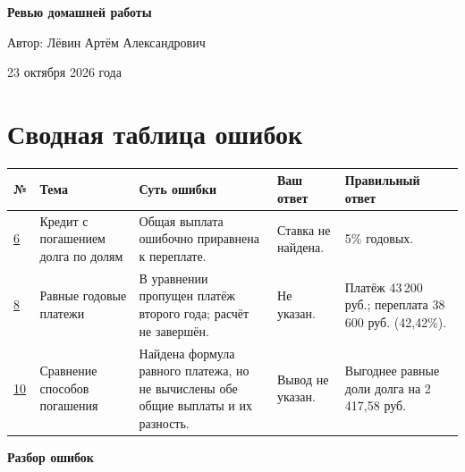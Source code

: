 \documentclass[12pt,a4paper]{article}
\begin{document}
\thispagestyle{empty}
\vspace*{0.28\textheight}
\begin{center}
{\Huge\bfseries Ревью домашней работы\par}
\vspace{20mm}
{\large Автор: Лёвин Артём Александрович\par}
\vspace{5mm}
{\large 23 октября 2026 года\par}
\end{center}
\vfill
\begin{center}
\end{center}
\newpage

\section*{Сводная таблица ошибок}
{\small
\setlength{\tabcolsep}{4pt}
\begin{longtable}{@{}p{0.9cm}p{2.5cm}p{4.65cm}p{3.0cm}p{3.5cm}@{}}
\toprule
\textbf{№} & \textbf{Тема} & \textbf{Суть ошибки} & \textbf{Ваш ответ} & \textbf{Правильный ответ} \\
\midrule
\endhead
\hyperref[task:6]{6} & Кредит с погашением долга по долям & Общая выплата ошибочно приравнена к переплате. & Ставка не найдена. & 5\% годовых. \\
\midrule
\hyperref[task:8]{8} & Равные годовые платежи & В уравнении пропущен платёж второго года; расчёт не завершён. & Не указан. & Платёж 43\,200 руб.; переплата 38\,600 руб. (42,42\%). \\
\midrule
\hyperref[task:10]{10} & Сравнение способов погашения & Найдена формула равного платежа, но не вычислены обе общие выплаты и их разность. & Вывод не указан. & Выгоднее равные доли долга на 2\,417,58 руб. \\
\bottomrule
\end{longtable}
}

\newpage
\thispagestyle{empty}
\vspace*{\fill}
\begin{center}
{\LARGE\bfseries Разбор ошибок}
\end{center}
\vspace*{\fill}
\newpage
\end{document}

